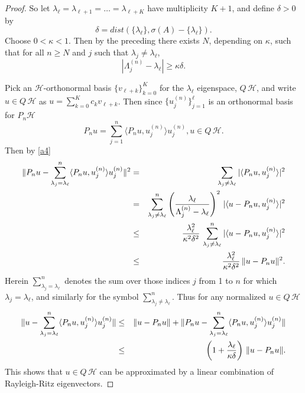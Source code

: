 \documentclass[final]{siamltex}
\numberwithin{equation}{section}
\begin{document}
\begin{proof}
So let $\lambda_{\ell}=\lambda_{\ell+1}=\ldots = \lambda_{\ell+K}$ have multiplicity $K+1$, and define $\delta>0$ by
\[\delta=dist(\{\lambda_{\ell}\}, \sigma(A)-\{\lambda_{\ell}\}).\]
Choose $0<\kappa<1$. Then by the preceding there exists $N$, depending on $\kappa$, such that for all $n\ge N$ and $j$ such that $\lambda_j\neq \lambda_{\ell}$,
\[|\Lambda_{j}^{(n)}-\lambda_{\ell}|\ge \kappa \delta.\]

Pick an $\mathcal{H}$-orthonormal basis $\{v_{\ell+k}\}_{k=0}^K$ for the $\lambda_{\ell}$ eigenspace, $Q \, \mathcal{H}$, and write $u\in Q \, \mathcal{H}$ as
$u=\sum_{k=0}^K c_k v_{\ell+k}$. Then since $\{u_{j}^{(n)}\}_{j=1}^{\ell}$ is an orthonormal basis for $P_n \mathcal{H}$
\[P_n u = \sum_{j=1}^n \langle P_n u, u_{j}^{(n)}\rangle u_{j}^{(n)}, u\in Q \, \mathcal{H}.\]
Then by \eqref{a4}
\begin{eqnarray}
\|P_n u - \sum_{\lambda_j=\lambda_{\ell}}^n \langle P_n u, u_{j}^{(n)}\rangle u_{j}^{(n)}\|^2 &=&
\sum_{\lambda_j\neq\lambda_{\ell}} |\langle P_n u, u_{j}^{(n)}\rangle|^2 \notag \\
&=& \sum_{\lambda_j\neq\lambda_{\ell}}^n \left( \frac{\lambda_{\ell}}{\Lambda_j^{(n)}-\lambda_{\ell}}\right)^2 \, |\langle u-P_n u, u_{j}^{(n)}\rangle|^2 \notag \\
&\le & \frac{\lambda_{\ell}^2}{\kappa^2 \delta^2} \,
\sum_{\lambda_j\neq\lambda_{\ell}}^n |\langle u-P_n u, u_{j}^{(n)}\rangle|^2 \notag \\
&\le & \frac{\lambda_{\ell}^2}{\kappa^2 \delta^2} \, \|u-P_n u\|^2. \notag
\end{eqnarray}
Herein $\sum_{\lambda_j=\lambda_{\ell}}^n$ denotes the sum over those indices $j$ from 1 to $n$ for which $\lambda_j=\lambda_{\ell}$, and similarly for the symbol $\sum_{\lambda_j\neq\lambda_{\ell}}^n$.
Thus for any normalized $u \in Q \, \mathcal{H}$
\begin{eqnarray}
\|u- \sum_{\lambda_j=\lambda_{\ell}}^n \langle P_n u, u_{j}^{(n)}\rangle u_{j}^{(n)}\|
&\le& \|u - P_n u\| + \|P_n u - \sum_{\lambda_j=\lambda_{\ell}}^n \langle P_n u, u_{j}^{(n)}\rangle u_{j}^{(n)}\| \notag \\
&\le& \left(1+ \frac{\lambda_{\ell}}{\kappa \delta}\right)\, \|u - P_n u\|. \label{a5}
\end{eqnarray}
This shows that $u \in Q \, \mathcal{H}$ can be approximated by a linear combination of Rayleigh-Ritz eigenvectors.


\end{proof}
\end{document}

